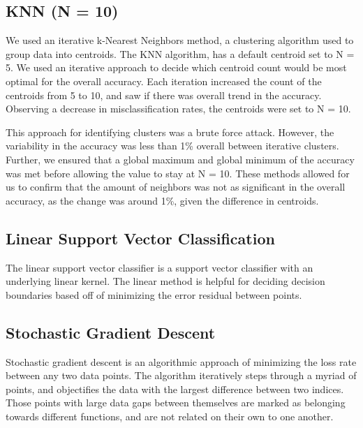 \documentclass[12pt]{article}
\begin{document}
\subsection{KNN (N = 10)}
We used an iterative k-Nearest Neighbors method, a clustering algorithm used to group data into centroids. The KNN algorithm, has a default centroid set to N = 5.  We used an iterative approach to decide which centroid count would be most optimal for the overall accuracy. Each iteration increased the count of the centroids from 5 to 10, and saw if there was overall trend in the accuracy. Observing a decrease in misclassification rates, the centroids were set to N = 10. 

This approach for identifying clusters was a brute force attack. However, the variability in the accuracy was less than 1\% overall between iterative clusters. Further, we ensured that a global maximum and global minimum of the accuracy was met before allowing the value to stay at N = 10. These methods allowed for us to confirm that the amount of neighbors was not as significant in the overall accuracy, as the change was around 1\%, given the difference in centroids. 

\subsection{Linear Support Vector Classification}
The linear support vector classifier is a support vector classifier with an underlying linear kernel. The linear method is helpful for deciding decision boundaries based off of minimizing the error residual between points. 

\subsection{Stochastic Gradient Descent}
Stochastic gradient descent is an algorithmic approach of minimizing the loss rate between any two data points. The algorithm iteratively steps through a myriad of points, and objectifies the data with the largest difference between two indices. Those points with large data gaps between themselves are marked as belonging towards different functions, and are not related on their own to one another. 
\end{document}
